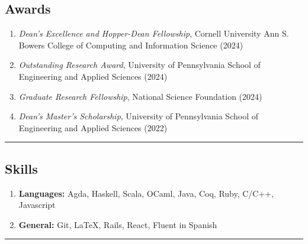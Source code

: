 \documentclass[letterpaper]{article}
\begin{document}
\subsection*{Awards}
\begin{enumerate}[label=]
	\parskip=-0.25em
    \item \emph{Dean's Excellence and Hopper-Dean Fellowship}, Cornell University Ann S. Bowers College of Computing and Information Science (2024)
    \item \emph{Outstanding Research Award}, University of Pennsylvania School of Engineering and Applied Sciences (2024)
    \item \emph{Graduate Research Fellowship}, National Science Foundation (2024)
    \item \emph{Dean's Master's Scholarship}, University of Pennsylvania School of Engineering and Applied Sciences (2022)
\end{enumerate}
\hrule

\subsection*{Skills}
\begin{enumerate}[label=]
	\parskip=-0.25em

	\item
	\textbf{Languages: } Agda, Haskell, Scala, OCaml, Java, Coq, Ruby, C/C++, Javascript

	\item
	\textbf{General: } Git, \LaTeX, Rails, React, Fluent in Spanish

\end{enumerate}
\hrule
\end{document}
